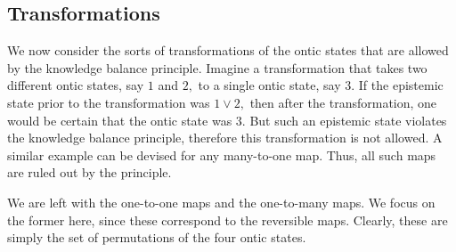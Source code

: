 \documentclass[pra,twocolumn,nofootinbib,showpacs]{revtex4}
\begin{document}
\subsection{Transformations}

\label{transformations1}

We now consider the sorts of transformations of the ontic states that are
allowed by the knowledge balance principle. Imagine a transformation that
takes two different ontic states, say $1$ and $2,$ to a single ontic state,
say $3$. If the epistemic state prior to the transformation was $1\vee 2,$
then after the transformation, one would be certain that the ontic state was
$3.$ But such an epistemic state violates the knowledge balance principle,
therefore this transformation is not allowed. A similar example can be
devised for any many-to-one map. Thus, all such maps are ruled out by the
principle.

We are left with the one-to-one maps and the one-to-many maps. We focus on
the former here, since these correspond to the reversible maps. Clearly,
these are simply the set of permutations of the four ontic states.
\end{document}
